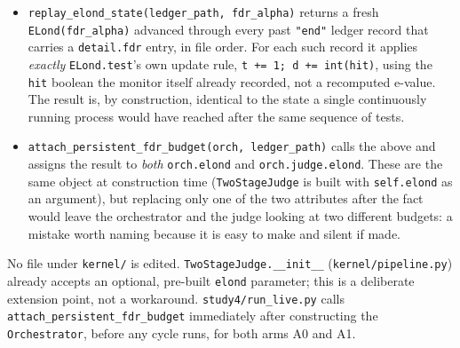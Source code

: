 \documentclass[11pt]{article}
\begin{document}
\begin{itemize}\setlength\itemsep{1pt}
\item \texttt{replay\_elond\_state(ledger\_path, fdr\_alpha)} returns a fresh \texttt{ELond(fdr\_alpha)} advanced through every past \texttt{"end"} ledger record that carries a \texttt{detail.fdr} entry, in file order. For each such record it applies \emph{exactly} \texttt{ELond.test}'s own update rule, \texttt{t += 1; d += int(hit)}, using the \texttt{hit} boolean the monitor itself already recorded, not a recomputed e-value. The result is, by construction, identical to the state a single continuously running process would have reached after the same sequence of tests.
\item \texttt{attach\_persistent\_fdr\_budget(orch, ledger\_path)} calls the above and assigns the result to \emph{both} \texttt{orch.elond} and \texttt{orch.judge.elond}. These are the same object at construction time (\texttt{TwoStageJudge} is built with \texttt{self.elond} as an argument), but replacing only one of the two attributes after the fact would leave the orchestrator and the judge looking at two different budgets: a mistake worth naming because it is easy to make and silent if made.
\end{itemize}

No file under \texttt{kernel/} is edited. \texttt{TwoStageJudge.\_\_init\_\_} (\texttt{kernel/pipeline.py}) already accepts an optional, pre-built \texttt{elond} parameter; this is a deliberate extension point, not a workaround. \texttt{study4/run\_live.py} calls \texttt{attach\_persistent\_fdr\_budget} immediately after constructing the \texttt{Orchestrator}, before any cycle runs, for both arms A0 and A1.
\end{document}
